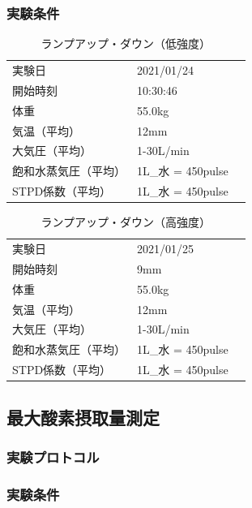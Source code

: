 \subsubsection{実験条件}

\begin{table}[h]
  \begin{center}
  \caption{ランプアップ・ダウン（低強度）}
  \label{tb:YFS201_specsheet}
    \begin{tabular}{ll}
      実験日 & 2021/01/24 \\
      開始時刻 & 10:30:46 \\
      体重 & 55.0kg \\
      気温（平均） & 12mm \\
      大気圧（平均） & 1-30L/min \\
      飽和水蒸気圧（平均） & 1L_{水} = 450pulse　\\
      STPD係数（平均） & 1L_{水} = 450pulse
    \end{tabular}
  \end{center}
\end{table}

\begin{table}[h]
  \begin{center}
  \caption{ランプアップ・ダウン（高強度）}
  \label{tb:YFS201_specsheet}
    \begin{tabular}{ll}
      実験日 & 2021/01/25 \\
      開始時刻 & 9mm \\
      体重 & 55.0kg \\
      気温（平均） & 12mm \\
      大気圧（平均） & 1-30L/min \\
      飽和水蒸気圧（平均） & 1L_{水} = 450pulse　\\
      STPD係数（平均） & 1L_{水} = 450pulse
    \end{tabular}
  \end{center}
\end{table}

\subsection{最大酸素摂取量測定}

\subsubsection{実験プロトコル}

\subsubsection{実験条件}

